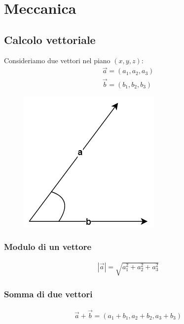 \chapter{Meccanica}

\section{Calcolo vettoriale}
Consideriamo due vettori nel piano $(x,y,z)$:
	\begin{displaymath}\begin{aligned}
		\vec{a} = (a_1, a_2, a_3)\\
        \vec{b} = (b_1, b_2, b_3)    
	\end{aligned}\end{displaymath}
    \begin{figure}[h!]
        	\centering
            \includegraphics[scale = 0.4]{Pictures/vettori.png}
        \end{figure}
        
\subsection{Modulo di un vettore}
	\begin{displaymath}\begin{aligned}
		|\vec{a}| = \sqrt{a_1^2 + a_2^2 + a_3^2}
	\end{aligned}\end{displaymath}
    
\subsection{Somma di due vettori}
	\begin{displaymath}\begin{aligned}
		\vec{a} + \vec{b} = (a_1 + b_1, a_2 + b_2, a_3 + b_3)
    \end{aligned}\end{displaymath}
    
